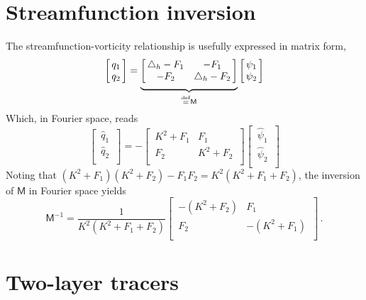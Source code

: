 \documentclass[12pt, oneside]{article}
\newcommand*\mystrut[1]{\vrule width0pt height0pt depth#1\relax}
\newcommand{\per}{\, .}
\newcommand{\defn}{\ensuremath{\stackrel{\mathrm{def}}{=}}}
\newcommand{\beq}{\begin{equation}}
\newcommand{\eeq}{\end{equation}}
\newcommand{\hlap}{\triangle_h}
\begin{document}
\section{Streamfunction inversion}

The streamfunction-vorticity relationship is usefully expressed in matrix form, 
\beq
\left [ \, \begin{matrix}
q_1 \\
q_2 \\
\end{matrix} \, \right ] = \underbrace{ \mystrut{3ex} \left [ \,
\begin{matrix} 
\hlap - F_1 & - F_1 \\
- F_2 & \hlap - F_2 \\
\end{matrix} \, \right ]}_{\defn \mathsf{M}} \left [ \, \begin{matrix}
\psi_1 \\
\psi_2 \\
\end{matrix} \, \right ]
\eeq
Which, in Fourier space, reads
\beq
\left [ \, \begin{matrix}
\hat q_1 \\
\hat q_2 \\
\end{matrix} \, \right ] = - \left [ \,
\begin{matrix} 
K^2 + F_1 & F_1 \\
F_2 & K^2 + F_2  \\
\end{matrix} \, \right ] \left [ \, \begin{matrix}
\hat \psi_1 \\
\hat \psi_2 \\
\end{matrix} \, \right ]
\eeq
Noting that $\left ( K^2 + F_1 \right ) \left ( K^2 + F_2 \right ) - F_1 F_2 = K^2 \left ( K^2 + F_1 + F_2 \right )$, the inversion of $\mathsf{M}$ in Fourier space yields
\beq
\mathsf{M}^{-1} = \frac{1}{K^2 \left ( K^2 + F_1 + F_2 \right )} \left [ \,
\begin{matrix}
- \left ( K^2 + F_2 \right ) & F_1 \\
F_2 & - \left (K^2 + F_1\right ) \\
\end{matrix} \, \right ] \per
\eeq

\section{Two-layer tracers}
\end{document}
